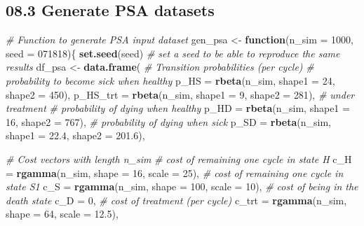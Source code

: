 \documentclass[
]{article}
\newenvironment{Shaded}{\begin{snugshade}}{\end{snugshade}}
\newcommand{\CommentTok}[1]{\textcolor[rgb]{0.56,0.35,0.01}{\textit{#1}}}
\newcommand{\ControlFlowTok}[1]{\textcolor[rgb]{0.13,0.29,0.53}{\textbf{#1}}}
\newcommand{\DataTypeTok}[1]{\textcolor[rgb]{0.13,0.29,0.53}{#1}}
\newcommand{\DecValTok}[1]{\textcolor[rgb]{0.00,0.00,0.81}{#1}}
\newcommand{\FloatTok}[1]{\textcolor[rgb]{0.00,0.00,0.81}{#1}}
\newcommand{\KeywordTok}[1]{\textcolor[rgb]{0.13,0.29,0.53}{\textbf{#1}}}
\newcommand{\NormalTok}[1]{#1}
\newcommand{\StringTok}[1]{\textcolor[rgb]{0.31,0.60,0.02}{#1}}
\begin{document}
\hypertarget{generate-psa-datasets}{%
\subsection{08.3 Generate PSA datasets}\label{generate-psa-datasets}}

\begin{Shaded}
\begin{Highlighting}[]
\CommentTok{# Function to generate PSA input dataset}
\NormalTok{gen_psa <-}\StringTok{ }\ControlFlowTok{function}\NormalTok{(}\DataTypeTok{n_sim =} \DecValTok{1000}\NormalTok{, }\DataTypeTok{seed =} \DecValTok{071818}\NormalTok{)\{}
  \KeywordTok{set.seed}\NormalTok{(seed) }\CommentTok{# set a seed to be able to reproduce the same results}
\NormalTok{  df_psa <-}\StringTok{ }\KeywordTok{data.frame}\NormalTok{(}
    \CommentTok{# Transition probabilities (per cycle)}
    \CommentTok{# probability to become sick when healthy}
    \DataTypeTok{p_HS     =} \KeywordTok{rbeta}\NormalTok{(n_sim, }\DataTypeTok{shape1 =} \DecValTok{24}\NormalTok{, }\DataTypeTok{shape2 =} \DecValTok{450}\NormalTok{), }
    \DataTypeTok{p_HS_trt =} \KeywordTok{rbeta}\NormalTok{(n_sim, }\DataTypeTok{shape1 =} \DecValTok{9}\NormalTok{,  }\DataTypeTok{shape2 =} \DecValTok{281}\NormalTok{),   }\CommentTok{# under treatment}
    \CommentTok{# probability of dying when healthy}
    \DataTypeTok{p_HD     =} \KeywordTok{rbeta}\NormalTok{(n_sim, }\DataTypeTok{shape1 =} \DecValTok{16}\NormalTok{, }\DataTypeTok{shape2 =} \DecValTok{767}\NormalTok{),}
    \CommentTok{# probability of dying when sick}
    \DataTypeTok{p_SD     =} \KeywordTok{rbeta}\NormalTok{(n_sim, }\DataTypeTok{shape1 =} \FloatTok{22.4}\NormalTok{, }\DataTypeTok{shape2 =} \FloatTok{201.6}\NormalTok{), }

    \CommentTok{# Cost vectors with length n_sim}
    \CommentTok{# cost of remaining one cycle in state H}
    \DataTypeTok{c_H      =} \KeywordTok{rgamma}\NormalTok{(n_sim, }\DataTypeTok{shape =} \DecValTok{16}\NormalTok{, }\DataTypeTok{scale =} \DecValTok{25}\NormalTok{), }
    \CommentTok{# cost of remaining one cycle in state S1}
    \DataTypeTok{c_S      =} \KeywordTok{rgamma}\NormalTok{(n_sim, }\DataTypeTok{shape =} \DecValTok{100}\NormalTok{, }\DataTypeTok{scale =} \DecValTok{10}\NormalTok{), }
    \CommentTok{# cost of being in the death state}
    \DataTypeTok{c_D      =} \DecValTok{0}\NormalTok{, }
    \CommentTok{# cost of treatment (per cycle)}
    \DataTypeTok{c_trt    =} \KeywordTok{rgamma}\NormalTok{(n_sim, }\DataTypeTok{shape =} \DecValTok{64}\NormalTok{, }\DataTypeTok{scale =} \FloatTok{12.5}\NormalTok{),}
    

\end{Highlighting}
\end{Shaded}
\end{document}
